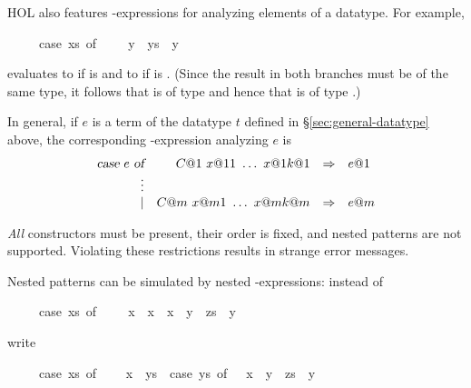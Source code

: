 %
\begin{isabellebody}%
\def\isabellecontext{case{\isacharunderscore}exprs}%
%
\isadelimtheory
%
\endisadelimtheory
%
\isatagtheory
\isamarkupfalse%
%
\endisatagtheory
{\isafoldtheory}%
%
\isadelimtheory
%
\endisadelimtheory
%
\isamarkuptrue%
%
\begin{isamarkuptext}%
\label{sec:case-expressions}%
HOL also features -expressions for analyzing
elements of a datatype. For example,
\begin{isabelle}%
\ \ \ \ \ case\ xs\ of\ {\isacharbrackleft}{\isacharbrackright}\ {\isasymRightarrow}\ {\isacharbrackleft}{\isacharbrackright}\ {\isacharbar}\ y\ {\isacharhash}\ ys\ {\isasymRightarrow}\ y%
\end{isabelle}
evaluates to \isa{{\isacharbrackleft}{\isacharbrackright}} if  is \isa{{\isacharbrackleft}{\isacharbrackright}} and to  if 
 is . (Since the result in both branches must be of
the same type, it follows that  is of type  and hence
that  is of type .)

In general, if $e$ is a term of the datatype $t$ defined in
\S\ref{sec:general-datatype} above, the corresponding
-expression analyzing $e$ is
\[
\begin{array}{rrcl}
\emph{\sl case}~e~\emph{\sl of} & C@1~x@ {11}~\dots~x@ {1k@1} & \Rightarrow & e@1 \\
                           \vdots \\
                           \mid & C@m~x@ {m1}~\dots~x@ {mk@m} & \Rightarrow & e@m
\end{array}
\]

\begin{warn}
\emph{All} constructors must be present, their order is fixed, and nested
patterns are not supported.  Violating these restrictions results in strange
error messages.
\end{warn}
\noindent
Nested patterns can be simulated by nested -expressions: instead
of
\begin{isabelle}%
\ \ \ \ \ case\ xs\ of\ {\isacharbrackleft}{\isacharbrackright}\ {\isacharequal}{\isachargreater}\ {\isacharbrackleft}{\isacharbrackright}\ {\isacharbar}\ {\isacharbrackleft}x{\isacharbrackright}\ {\isacharequal}{\isachargreater}\ x\ {\isacharbar}\ x\ {\isacharhash}\ {\isacharparenleft}y\ {\isacharhash}\ zs{\isacharparenright}\ {\isacharequal}{\isachargreater}\ y%
\end{isabelle}
write
\begin{isabelle}%
\ \ \ \ \ case\ xs\ of\ {\isacharbrackleft}{\isacharbrackright}\ {\isasymRightarrow}\ {\isacharbrackleft}{\isacharbrackright}\isanewline
\isaindent{\ \ \ \ \ }{\isacharbar}\ x\ {\isacharhash}\ ys\ {\isasymRightarrow}\ case\ ys\ of\ {\isacharbrackleft}{\isacharbrackright}\ {\isasymRightarrow}\ x\ {\isacharbar}\ y\ {\isacharhash}\ zs\ {\isasymRightarrow}\ y%
\end{isabelle}


\end{isamarkuptext}
\end{isabellebody}
